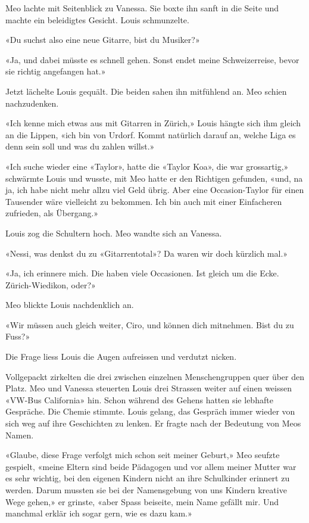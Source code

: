 Meo lachte mit Seitenblick zu Vanessa. Sie boxte ihn sanft in die Seite und machte ein beleidigtes Gesicht. 
Louis schmunzelte.

«Du suchst also eine neue Gitarre, bist du Musiker?»

«Ja, und dabei müsste es schnell gehen. Sonst endet meine
Schweizerreise, bevor sie richtig angefangen hat.»

Jetzt lächelte Louis gequält.
Die beiden sahen ihn mitfühlend an. Meo schien nachzudenken.

«Ich kenne mich etwas aus mit Gitarren in Zürich,» Louis hängte sich ihm
gleich an die Lippen, «ich bin von Urdorf. Kommt natürlich darauf an,
welche Liga es denn sein soll und was du zahlen willst.»

«Ich suche wieder eine «Taylor», hatte die «Taylor Koa», die war
grossartig,» schwärmte Louis und wusste, mit Meo hatte er den Richtigen gefunden,
«und, na ja, ich habe nicht mehr allzu viel Geld übrig. Aber eine
Occasion-Taylor für einen Tausender wäre vielleicht zu bekommen. Ich bin
auch mit einer Einfacheren zufrieden, als Übergang.»

Louis zog die Schultern hoch. Meo wandte sich an Vanessa.

«Nessi, was denkst du zu «Gitarrentotal»? Da waren wir doch kürzlich
mal.»

«Ja, ich erinnere mich. Die haben viele Occasionen. Ist gleich um die
Ecke. Zürich-Wiedikon, oder?»

Meo blickte Louis nachdenklich an.

«Wir müssen auch gleich weiter, Ciro, und können dich mitnehmen. Bist du
zu Fuss?» 

Die Frage liess Louis die Augen aufreissen und verdutzt nicken.

Vollgepackt zirkelten die drei zwischen einzelnen Menschengruppen quer über den
Platz. Meo und Vanessa steuerten Louis drei Strassen weiter auf einen
weissen «VW-Bus California» hin.
Schon während des Gehens hatten sie lebhafte Gespräche. Die Chemie
stimmte.
Louis gelang, das Gespräch immer wieder von sich weg auf ihre
Geschichten zu lenken. Er fragte nach der Bedeutung von Meos Namen.

«Glaube, diese Frage verfolgt mich schon seit meiner Geburt,» Meo
seufzte gespielt, «meine Eltern sind beide Pädagogen und vor allem
meiner Mutter war es sehr wichtig, bei den eigenen Kindern nicht an ihre
Schulkinder erinnert zu werden. Darum mussten sie bei der Namensgebung von
uns Kindern kreative Wege gehen,» er grinste, «aber Spass beiseite, mein Name
gefällt mir. Und manchmal erklär ich sogar gern, wie es dazu kam.»

